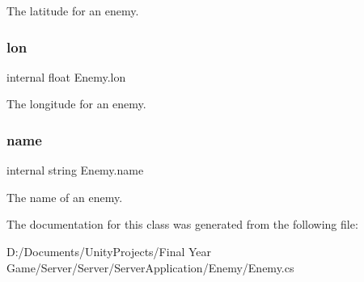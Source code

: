 The latitude for an enemy. 

\mbox{\label{class_enemy_a8ae77cbcd385c768eb0649a31718a08e}} 
\subsubsection{\texorpdfstring{lon}{lon}}
{\footnotesize\ttfamily internal float Enemy.\+lon\hspace{0.3cm}{\ttfamily [private]}}



The longitude for an enemy. 

\mbox{\label{class_enemy_a76e75afdb1a83151f0b816c375995b64}} 
\subsubsection{\texorpdfstring{name}{name}}
{\footnotesize\ttfamily internal string Enemy.\+name\hspace{0.3cm}{\ttfamily [private]}}



The name of an enemy. 



The documentation for this class was generated from the following file\+:\begin{DoxyCompactItemize}
\item 
D\+:/\+Documents/\+Unity\+Projects/\+Final Year Game/\+Server/\+Server/\+Server\+Application/\+Enemy/Enemy.\+cs\end{DoxyCompactItemize}
